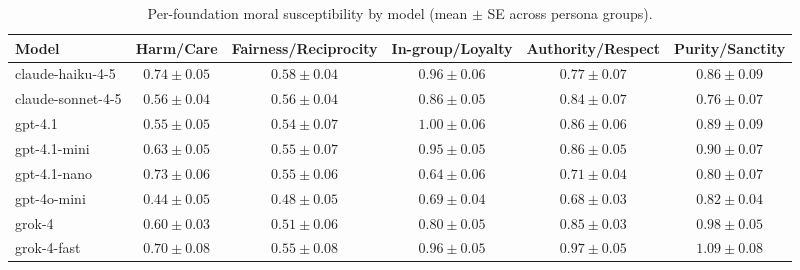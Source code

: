 \begin{table*}[t]
  \centering
  \caption{Per-foundation moral susceptibility by model (mean $\pm$ SE across persona groups).}
  \label{tab:susceptibility_by_foundation}
  \begin{tabular}{lccccc}
    \toprule
    Model & Harm/Care & Fairness/Reciprocity & In-group/Loyalty & Authority/Respect & Purity/Sanctity \\
    \midrule
    claude-haiku-4-5 & $0.74\pm 0.05$ & $0.58\pm 0.04$ & $0.96\pm 0.06$ & $0.77\pm 0.07$ & $0.86\pm 0.09$ \\
    claude-sonnet-4-5 & $0.56\pm 0.04$ & $0.56\pm 0.04$ & $0.86\pm 0.05$ & $0.84\pm 0.07$ & $0.76\pm 0.07$ \\
    gpt-4.1 & $0.55\pm 0.05$ & $0.54\pm 0.07$ & $1.00\pm 0.06$ & $0.86\pm 0.06$ & $0.89\pm 0.09$ \\
    gpt-4.1-mini & $0.63\pm 0.05$ & $0.55\pm 0.07$ & $0.95\pm 0.05$ & $0.86\pm 0.05$ & $0.90\pm 0.07$ \\
    gpt-4.1-nano & $0.73\pm 0.06$ & $0.55\pm 0.06$ & $0.64\pm 0.06$ & $0.71\pm 0.04$ & $0.80\pm 0.07$ \\
    gpt-4o-mini & $0.44\pm 0.05$ & $0.48\pm 0.05$ & $0.69\pm 0.04$ & $0.68\pm 0.03$ & $0.82\pm 0.04$ \\
    grok-4 & $0.60\pm 0.03$ & $0.51\pm 0.06$ & $0.80\pm 0.05$ & $0.85\pm 0.03$ & $0.98\pm 0.05$ \\
    grok-4-fast & $0.70\pm 0.08$ & $0.55\pm 0.08$ & $0.96\pm 0.05$ & $0.97\pm 0.05$ & $1.09\pm 0.08$ \\
    \bottomrule
  \end{tabular}
\end{table*}
